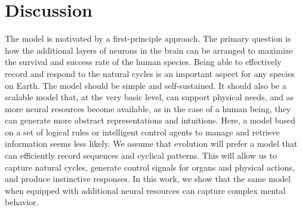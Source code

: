 \documentclass[reprint,amsmath,amssymb,apr,aip,onecolumn, 11pt]{revtex4-1}
\begin{document}


	

	
	
	\section{Discussion}
	
The model is motivated by a first-principle approach. The primary question is how the additional layers of neurons in the brain can be arranged to maximize the survival and success rate of the human species. Being able to effectively record and respond to the natural cycles is an important aspect for any species on Earth. The model should be simple and self-sustained. It should also be a scalable model that, at the very basic level, can support physical needs, and as more neural resources become available, as in the case of a human being, they can generate more abstract representations and intuitions. Here, a model based on a set of logical rules or intelligent control agents to manage and retrieve information seems less likely. We assume that evolution will prefer a model that can efficiently record sequences and cyclical patterns. This will allow us to capture natural cycles, generate control signals for organs and physical actions, and produce instinctive responses. In this work, we show that the same model when equipped with additional neural resources can capture complex mental behavior.  
\end{document}

